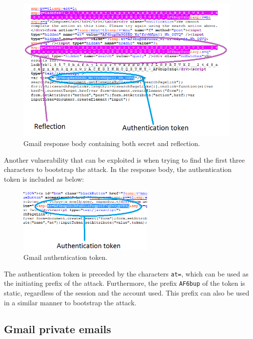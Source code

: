 \begin{figure}[H] \caption{Gmail response body containing both secret and
reflection.} \centering
\includegraphics[width=1\textwidth]{diagrams/gmail_response.png}\end{figure}

Another vulnerability that can be exploited is when trying to find the first
three characters to bootstrap the attack. In the response body, the
authentication token is included as below:

\begin{figure}[H] \caption{Gmail authentication token.} \centering
\includegraphics[width=0.6\textwidth]{diagrams/gmail_bootstrap.png}\end{figure}

The authentication token is preceded by the characters \texttt{at=}, which can
be used as the initiating prefix of the attack. Furthermore, the prefix
\texttt{AF6bup} of the token is static, regardless of the session and the
account used. This prefix can also be used in a similar manner to bootstrap the
attack.

\subsection{Gmail private emails}\label{subsec:gmail_mail}

